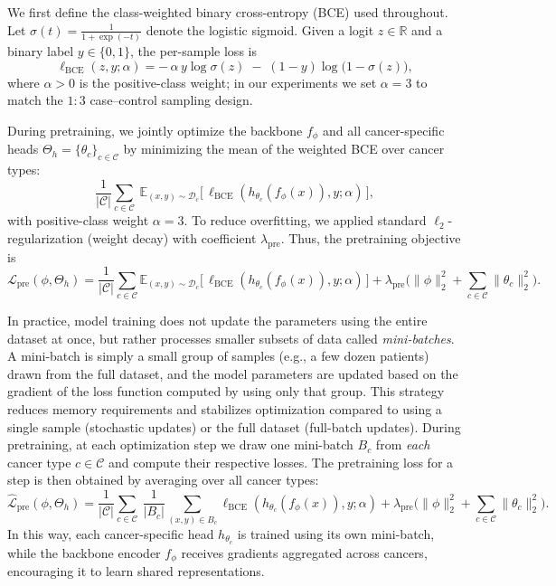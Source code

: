 \documentclass[diagnostics,article,submit,pdftex,moreauthors]{Definitions/mdpi}
\newcommand{\preDecayC}{\lambda_{\mathrm{pre}}}  %
\begin{document}
We first define the class-weighted binary cross-entropy (BCE) used throughout.
Let $\sigma(t)=\frac{1}{1+\exp(-t)}$ denote the logistic sigmoid.
Given a logit $z\in\mathbb{R}$ and a binary label $y\in\{0,1\}$, the per-sample loss is
\begin{equation}
  \label{eq:bce}
  \ell_{\mathrm{BCE}}(z,y;\alpha)
  = -\,\alpha\,y\log \sigma(z)\;-\;(1-y)\log\!\big(1-\sigma(z)\big),
  \end{equation}
where $\alpha>0$ is the positive-class weight; in our experiments we set $\alpha=3$ to match the $1{:}3$ case--control sampling design.

During pretraining, we jointly optimize the backbone $f_\phi$ and all cancer-specific heads $\Theta_h\!=\!\{\theta_c\}_{c\in\mathcal{C}}$ by minimizing the mean of the weighted BCE over cancer types:
\begin{equation}
  \frac{1}{|\mathcal{C}|}\sum_{c\in\mathcal{C}}
  \ \mathbb{E}_{(x,y)\sim\mathcal{D}_c}\!\big[\,\ell_{\mathrm{BCE}}(h_{\theta_c}(f_\phi(x)),y;\alpha)\,\big],
\end{equation}
with positive-class weight $\alpha{=}3$. 
To reduce overfitting, we applied standard $\ell_2$-regularization
(weight decay) with coefficient $\preDecayC$.
Thus, the pretraining objective is
\begin{equation}
  \label{eq:pre_obj}
  \mathcal{L}_{\mathrm{pre}}(\phi,\Theta_h)
  = \frac{1}{|\mathcal{C}|}\sum_{c\in\mathcal{C}}
  \mathbb{E}_{(x,y)\sim\mathcal{D}_c}\!\big[\,\ell_{\mathrm{BCE}}(h_{\theta_c}(f_\phi(x)),y;\alpha)\,\big]
  + \preDecayC \big( \|\phi\|_2^2 + \sum_{c\in\mathcal{C}} \|\theta_c\|_2^2 \big).
\end{equation}

In practice, model training does not update the parameters using the entire dataset at once, but rather processes smaller subsets of data called \emph{mini-batches}. 
A mini-batch is simply a small group of samples (e.g., a few dozen patients) drawn from the full dataset, and the model parameters are updated based on the gradient of the loss function computed by using only that group. 
This strategy reduces memory requirements and stabilizes optimization compared to using a single sample (stochastic updates) or the full dataset (full-batch updates).
During pretraining, at each optimization step we draw one mini-batch $B_c$ from \emph{each} cancer type $c\in\mathcal{C}$ and compute their respective losses. 
The pretraining loss for a step is then obtained by averaging over all cancer types:
\begin{equation}
  \label{eq:pre_mix}
  \hat{\mathcal{L}}_{\mathrm{pre}}(\phi,\Theta_h)
  =\frac{1}{|\mathcal{C}|}\sum_{c\in\mathcal{C}}\ \frac{1}{|B_c|}\!
  \sum_{(x,y)\in B_c}\ell_{\mathrm{BCE}}(h_{\theta_c}(f_\phi(x)),y;\alpha) 
  + \preDecayC \Big( \|\phi\|_2^2 + \sum_{c\in\mathcal{C}} \|\theta_c\|_2^2 \Big).
\end{equation}
In this way, each cancer-specific head $h_{\theta_c}$ is trained using its own mini-batch, while the backbone encoder $f_\phi$ receives gradients aggregated across cancers, encouraging it to learn shared representations.
\end{document}
